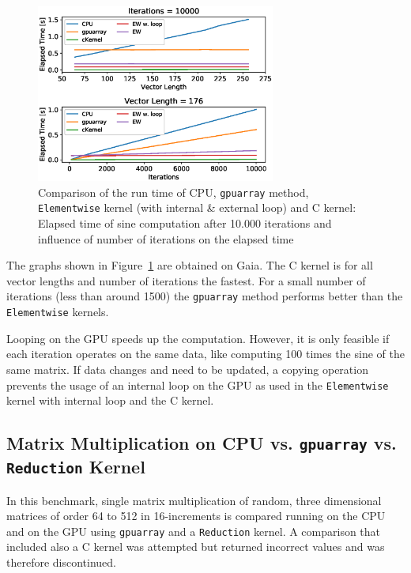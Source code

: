 \documentclass[11pt]{article}
\begin{document}
\begin{figure}[H]
    \centering
    \includegraphics[width=0.7\textwidth]{benchmark002_outData_gaia_K80}
    \caption{Comparison of the run time of CPU, \texttt{gpuarray} method, \texttt{Elementwise} kernel (with internal \& external loop) and C kernel: Elapsed time of sine computation after 10.000 iterations and influence of number of iterations on the elapsed time}
    \label{benchmark_006}
\end{figure}

The graphs shown in Figure~\ref{benchmark_006} are obtained on Gaia. The C kernel is for all vector lengths and number of iterations the fastest. For a small number of iterations (less than around 1500) the \texttt{gpuarray} method performs better than the \texttt{Elementwise} kernels.

Looping on the GPU speeds up the computation. However, it is only feasible if each iteration operates on the same data, like computing 100 times the sine of the same matrix. If data changes and need to be updated, a copying operation prevents the usage of an internal loop on the GPU as used in the \texttt{Elementwise} kernel with internal loop and the C kernel.

\subsection{Matrix Multiplication on CPU vs. \texttt{gpuarray} vs. \texttt{Reduction} Kernel}

In this benchmark, single matrix multiplication of random, three dimensional matrices of order 64 to 512 in 16-increments is compared running on the CPU and on the GPU using \texttt{gpuarray} and a \texttt{Reduction} kernel. A comparison that included also a C kernel was attempted but returned incorrect values and was therefore discontinued. 
\end{document}
